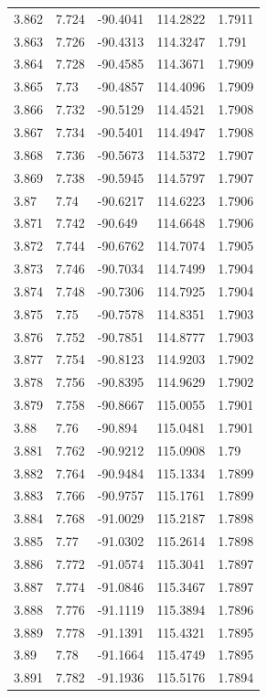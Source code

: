 \begin{tabular}{lllll}
3.862 & 7.724 & -90.4041 & 114.2822 & 1.7911 \\
3.863 & 7.726 & -90.4313 & 114.3247 & 1.791 \\
3.864 & 7.728 & -90.4585 & 114.3671 & 1.7909 \\
3.865 & 7.73 & -90.4857 & 114.4096 & 1.7909 \\
3.866 & 7.732 & -90.5129 & 114.4521 & 1.7908 \\
3.867 & 7.734 & -90.5401 & 114.4947 & 1.7908 \\
3.868 & 7.736 & -90.5673 & 114.5372 & 1.7907 \\
3.869 & 7.738 & -90.5945 & 114.5797 & 1.7907 \\
3.87 & 7.74 & -90.6217 & 114.6223 & 1.7906 \\
3.871 & 7.742 & -90.649 & 114.6648 & 1.7906 \\
3.872 & 7.744 & -90.6762 & 114.7074 & 1.7905 \\
3.873 & 7.746 & -90.7034 & 114.7499 & 1.7904 \\
3.874 & 7.748 & -90.7306 & 114.7925 & 1.7904 \\
3.875 & 7.75 & -90.7578 & 114.8351 & 1.7903 \\
3.876 & 7.752 & -90.7851 & 114.8777 & 1.7903 \\
3.877 & 7.754 & -90.8123 & 114.9203 & 1.7902 \\
3.878 & 7.756 & -90.8395 & 114.9629 & 1.7902 \\
3.879 & 7.758 & -90.8667 & 115.0055 & 1.7901 \\
3.88 & 7.76 & -90.894 & 115.0481 & 1.7901 \\
3.881 & 7.762 & -90.9212 & 115.0908 & 1.79 \\
3.882 & 7.764 & -90.9484 & 115.1334 & 1.7899 \\
3.883 & 7.766 & -90.9757 & 115.1761 & 1.7899 \\
3.884 & 7.768 & -91.0029 & 115.2187 & 1.7898 \\
3.885 & 7.77 & -91.0302 & 115.2614 & 1.7898 \\
3.886 & 7.772 & -91.0574 & 115.3041 & 1.7897 \\
3.887 & 7.774 & -91.0846 & 115.3467 & 1.7897 \\
3.888 & 7.776 & -91.1119 & 115.3894 & 1.7896 \\
3.889 & 7.778 & -91.1391 & 115.4321 & 1.7895 \\
3.89 & 7.78 & -91.1664 & 115.4749 & 1.7895 \\
3.891 & 7.782 & -91.1936 & 115.5176 & 1.7894 \\

\end{tabular}
